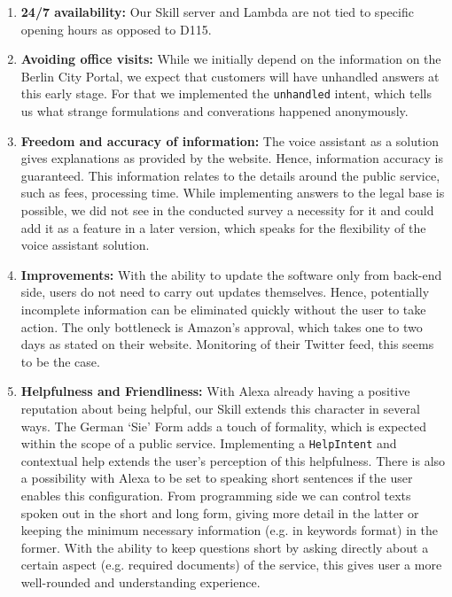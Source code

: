 \begin{enumerate}
	\item \textbf{24/7 availability:} Our Skill server and Lambda are not tied to specific opening hours as opposed to D115. 
	
	\item\textbf{ Avoiding office visits:} While we initially depend on the information on the Berlin City Portal, we expect that customers will have unhandled answers at this early stage. For that we implemented the \texttt{unhandled} intent, which tells us what strange formulations and converations happened anonymously.
	
	\item \textbf{Freedom and accuracy of information: } The voice assistant as a solution gives explanations as provided by the website. Hence, information accuracy is guaranteed. This information relates to the details around the public service, such as fees, processing time. While implementing answers to the legal base is possible, we did not see in the conducted survey a necessity for it and could add it as a feature in a later version, which speaks for the flexibility of the voice assistant solution. %
	
	\item  \textbf{Improvements: } With the ability to update the software only from back-end side, users do not need to carry out updates themselves. Hence, potentially incomplete information can be eliminated quickly without the user to take action. The only bottleneck is Amazon's approval, which takes one to two days as stated on their website. Monitoring of their Twitter feed, this seems to be the case. %
	
	\item \textbf{Helpfulness and Friendliness: } With Alexa already having a positive reputation about being helpful, our Skill extends this character in several ways. The German `Sie' Form adds a touch of formality, which is expected within the scope of a public service. Implementing a \texttt{HelpIntent} and contextual help extends the user's perception of this helpfulness. There is also a possibility with Alexa to be set to speaking short sentences if the user enables this configuration. From programming side we can control texts spoken out in the short and long form, giving more detail in the latter or keeping the minimum necessary information (e.g. in keywords format) in the former. %
	With the ability to keep questions short by asking directly about a certain aspect (e.g. required documents) of the service, this gives user a more well-rounded and understanding experience.
	

\end{enumerate}
